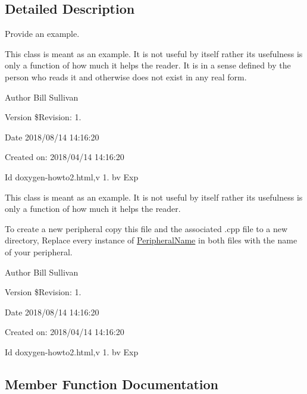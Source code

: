 \subsection{Detailed Description}
Provide an example. 

This class is meant as an example. It is not useful by itself rather its usefulness is only a function of how much it helps the reader. It is in a sense defined by the person who reads it and otherwise does not exist in any real form.

\begin{DoxyAuthor}{Author}
Bill Sullivan
\end{DoxyAuthor}
\begin{DoxyVersion}{Version}
\$\+Revision\+: 1.
\end{DoxyVersion}
\begin{DoxyDate}{Date}
2018/08/14 14\+:16\+:20
\end{DoxyDate}
Created on\+: 2018/04/14 14\+:16\+:20

\begin{DoxyParagraph}{Id}
doxygen-\/howto2.\+html,v 1. bv Exp 
\end{DoxyParagraph}


This class is meant as an example. It is not useful by itself rather its usefulness is only a function of how much it helps the reader.

To create a new peripheral copy this file and the associated .cpp file to a new directory, Replace every instance of \mbox{\hyperlink{class_peripheral_name}{Peripheral\+Name}} in both files with the name of your peripheral.

\begin{DoxyAuthor}{Author}
Bill Sullivan
\end{DoxyAuthor}
\begin{DoxyVersion}{Version}
\$\+Revision\+: 1.
\end{DoxyVersion}
\begin{DoxyDate}{Date}
2018/08/14 14\+:16\+:20
\end{DoxyDate}
Created on\+: 2018/04/14 14\+:16\+:20

\begin{DoxyParagraph}{Id}
doxygen-\/howto2.\+html,v 1. bv Exp 
\end{DoxyParagraph}


\subsection{Member Function Documentation}
\mbox{\label{class_peripheral_name_a63b193d5328d4800de3bb8905f1d2f20}} 
